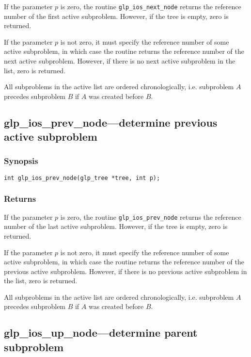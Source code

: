If the parameter $p$ is zero, the routine \verb|glp_ios_next_node|
returns the reference number of the first active subproblem. However,
if the tree is empty, zero is returned.

If the parameter $p$ is not zero, it must specify the reference number
of some active subproblem, in which case the routine returns the
reference number of the next active subproblem. However, if there is
no next active subproblem in the list, zero is returned.

All subproblems in the active list are ordered chronologically, i.e.
subproblem $A$ precedes subproblem $B$ if $A$ was created before $B$.

\subsection{glp\_ios\_prev\_node---determine previous active subproblem}

\subsubsection*{Synopsis}

\begin{verbatim}
int glp_ios_prev_node(glp_tree *tree, int p);
\end{verbatim}

\subsubsection*{Returns}

If the parameter $p$ is zero, the routine \verb|glp_ios_prev_node|
returns the reference number of the last active subproblem. However, if
the tree is empty, zero is returned.

If the parameter $p$ is not zero, it must specify the reference number
of some active subproblem, in which case the routine returns the
reference number of the previous active subproblem. However, if there
is no previous active subproblem in the list, zero is returned.

All subproblems in the active list are ordered chronologically, i.e.
subproblem $A$ precedes subproblem $B$ if $A$ was created before $B$.

\newpage

\subsection{glp\_ios\_up\_node---determine parent subproblem}

